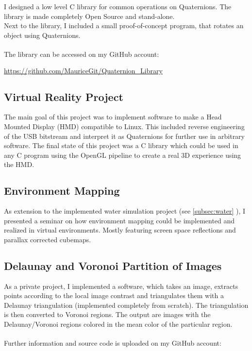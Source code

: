 \documentclass[a4paper, 12pt]{article}
\begin{document}
I designed a low level C library for common operations on Quaternions. The library is made completely 
Open Source and stand-alone.
\\
Next to the library, I included a small proof-of-concept program, that rotates an object using Quaternions.
\\
\\
The library can be accessed on my GitHub account:

\begin{center}
	\url{https://github.com/MauriceGit/Quaternion_Library}
\end{center}

\subsection{Virtual Reality Project}

The main goal of this project was to implement software to make a Head Mounted Display (HMD) compatible to Linux.
This included reverse engineering of the USB bitstream and interpret it as Quaternions for further use in arbitrary 
software. The final state of this project was a C library which could be used in any C program using the OpenGL
pipeline to create a real 3D experience using the HMD.

\subsection{Environment Mapping}

As extension to the implemented water simulation project (see \ref{subsec:water} \glqq{}\grqq), I
presented a seminar on how environment mapping could be implemented and realized in virtual environments.
Mostly featuring screen space reflections and parallax corrected cubemaps.

\subsection{Delaunay and Voronoi Partition of Images}

As a private project, I implemented a software, which takes an image, extracts points according to the local
image contrast and triangulates them with a Delaunay triangulation (implemented completely from scratch).
The triangulation is then converted to Voronoi regions. The output are images with the Delaunay/Voronoi
regions colored in the mean color of the particular region.
\\
\\
Further information and source code is uploaded on my GitHub account:
\end{document}
